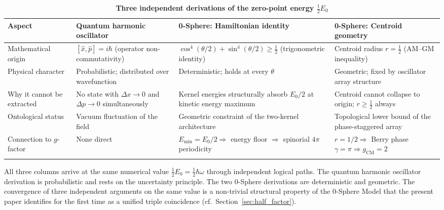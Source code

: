 \documentclass[%
 reprint,
 amsmath,amssymb,
 aps,
 prb,
]{revtex4-2}
\numberwithin{equation}{section}
\theoremstyle{definition}
\theoremstyle{remark}
\begin{document}
\begin{table}[t!]
\centering
\caption{\textbf{Three independent derivations of the zero-point energy $\frac{1}{2}E_0$}}
\label{tab:zpe_comparison}
\renewcommand{\arraystretch}{1.4}
\begin{tabular}{p{3.8cm}p{4.2cm}p{3.8cm}p{3.8cm}}
\toprule
\textbf{Aspect} & \textbf{Quantum harmonic oscillator} & \textbf{0-Sphere: Hamiltonian identity} & \textbf{0-Sphere: Centroid geometry} \\
\midrule
Mathematical origin
& $[\hat{x},\hat{p}] = i\hbar$ \newline (operator non-commutativity)
& $\cos^4\!(\theta/2) + \sin^4\!(\theta/2) \geq \frac{1}{2}$ \newline (trigonometric identity)
& Centroid radius $r = \frac{1}{2}$ \newline (AM--GM inequality) \\
\addlinespace[0.3cm]
Physical character
& Probabilistic; distributed over wavefunction
& Deterministic; holds at every $\theta$
& Geometric; fixed by oscillator array structure \\
\addlinespace[0.3cm]
Why it cannot be extracted
& No state with $\Delta x \to 0$ and $\Delta p \to 0$ simultaneously
& Kernel energies structurally absorb $E_0/2$ at kinetic energy maximum
& Centroid cannot collapse to origin; $r \geq \frac{1}{2}$ always \\
\addlinespace[0.3cm]
Ontological status
& Vacuum fluctuation of the field
& Geometric constraint of the two-kernel architecture
& Topological lower bound of the phase-staggered array \\
\addlinespace[0.3cm]
Connection to $g$-factor
& None direct
& $E_{\min} = E_0/2 \Rightarrow$ energy floor $\Rightarrow$ spinorial $4\pi$ periodicity
& $r = 1/2 \Rightarrow$ Berry phase $\gamma = \pi \Rightarrow g_{\text{CM}} = 2$ \\
\addlinespace[0.2cm]
\bottomrule
\end{tabular}
\vspace{0.2cm}
\begin{minipage}{0.95\textwidth}
\justifying\footnotesize
All three columns arrive at the same numerical value $\frac{1}{2}E_0 = \frac{1}{2}\hbar\omega$ through independent logical paths. The quantum harmonic oscillator derivation is probabilistic and rests on the uncertainty principle. The two 0-Sphere derivations are deterministic and geometric. The convergence of three independent arguments on the same value is a non-trivial structural property of the 0-Sphere Model that the present paper identifies for the first time as a unified triple coincidence (cf.\ Section~\ref{sec:half_factor}).
\end{minipage}
\end{table}
\end{document}
